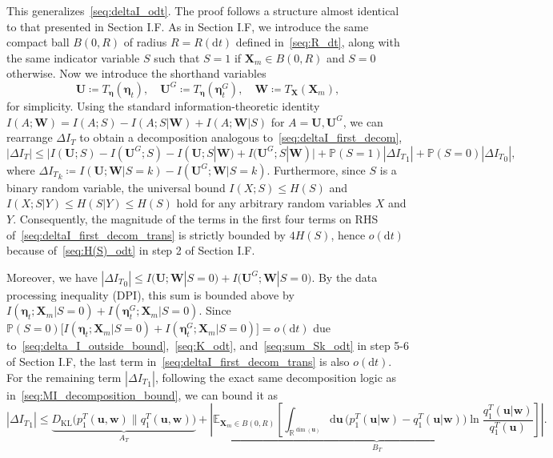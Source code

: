 \documentclass[
 longbibliography,
 twocolumn,
 superscriptaddress,
 amsmath,
 amssymb,
 amsthm,
 amsfonts,
 prl,
 floatfix,
]{revtex4-2}
\begin{document}
\begin{widetext}
This generalizes~\eqref{seq:deltaI_odt}. The proof follows a structure almost identical to that presented in Section I.F. As in Section I.F, we introduce the same compact ball $B(0,R)$ of radius $R=R(\mathrm dt)$ defined in~\eqref{seq:R_dt}, along with the same indicator variable $S$ such that $S=1$ if $\bm X_m\in B(0,R)$ and $S=0$ otherwise. 
Now we introduce the shorthand variables
\[
    \bm U\coloneq T_{\bm\eta}(\bm\eta_t),
    \quad
    \bm U^G\coloneq T_{\bm\eta}(\bm\eta_t^G),
    \quad
    \bm W\coloneq T_{\bm X}(\bm X_m),
\]
for simplicity. Using the standard information-theoretic identity $I(A;\bm W)=I(A;S)-I(A;S|\bm W)+I(A;\bm W|S)$ for $A=\bm U, \bm U^G$, we can rearrange $\Delta I_T$ to obtain a decomposition analogous to~\eqref{seq:deltaI_first_decom},
\begin{equation}
    |\Delta I_T| \le
    \big| I(\bm U; S) - I(\bm U^G; S) 
    - I(\bm U; S|\bm W) + I(\bm U^G; S|\bm W)\big|
    + \mathbb P(S=1)|\Delta {I_T}_1| + \mathbb P(S=0)|\Delta {I_T}_0|,
    \label{seq:deltaI_first_decom_trans}
\end{equation}
where $\Delta {I_T}_k\coloneq I(\bm U;\bm W|S=k)-I(\bm U^G;\bm W|S=k)$. Furthermore, since $S$ is a binary random variable, the universal bound $I(X;S)\leq H(S)$ and $I(X;S|Y)\leq H(S|Y)\leq H(S)$ hold for any arbitrary random variables $X$ and $Y$. Consequently, the magnitude of the terms in the first four terms on RHS of~\eqref{seq:deltaI_first_decom_trans} is strictly bounded by $4H(S)$, hence $o(\mathrm dt)$ because of~\eqref{seq:H(S)_odt} in step 2 of Section I.F.

Moreover, we have $|\Delta {I_T}_0|\le I\big(\bm U;\bm W|S=0\big) + I\big(\bm U^G;\bm W|S=0\big)$. By the data processing inequality (DPI), this sum is bounded above by $I(\bm\eta_t;\bm X_m|S=0) + I(\bm\eta_t^G;\bm X_m|S=0)$. Since $\mathbb P(S=0)\big[I(\bm\eta_t;\bm X_m|S=0)+I(\bm\eta_t^G;\bm X_m|S=0)\big] = o(\mathrm dt)$ due to~\eqref{seq:delta_I_outside_bound},~\eqref{seq:K_odt}, and~\eqref{seq:sum_Sk_odt} in step 5-6 of Section I.F, the last term in~\eqref{seq:deltaI_first_decom_trans} is also $o(\mathrm dt)$. For the remaining term $|\Delta {I_T}_1|$, following the exact same decomposition logic as in~\eqref{seq:MI_decomposition_bound}, we can bound it as
\begin{equation}
    |\Delta {I_T}_1| \leq 
    \underbrace{
    D_{\mathrm{KL}}\big(p_1^T(\bm u,\bm w)\|q_1^T(\bm u,\bm w)\big) }_{A_T}
    + \underbrace{
    \left|\mathbb E_{\bm X_m\in B(0,R)}\!\!\left[
    \int_{\mathbb R^{\dim(\bm u)}}\!\mathrm d\bm u\,\big(p_1^T(\bm u|\bm w)-q_1^T(\bm u|\bm w)\big)
    \ln\frac{q_1^T(\bm u|\bm w)}{q_1^T(\bm u)}\right]\right|}
    _{B_T}.
    \label{seq:MI_decomposition_bound_trans}
\end{equation}


\end{widetext}
\end{document}
